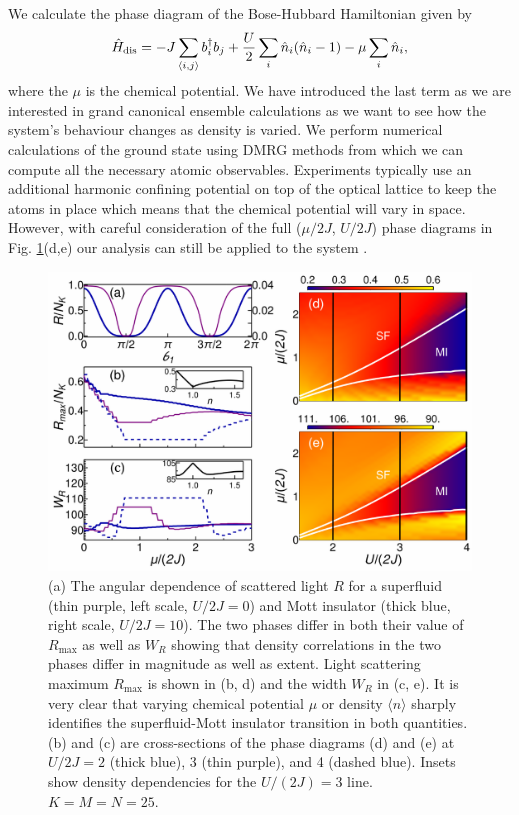 We calculate the phase diagram of the Bose-Hubbard Hamiltonian given
by
\begin{equation}
    \hat{H}_\mathrm{dis} = -J \sum_{\langle i, j \rangle}
    b^\dagger_i b_j + \frac{U}{2} \sum_i \hat{n}_i (\hat{n}_i - 1) - \mu
    \sum_i \hat{n}_i,
\end{equation}
where the $\mu$ is the chemical potential. We have introduced the last
term as we are interested in grand canonical ensemble calculations as
we want to see how the system's behaviour changes as density is
varied. We perform numerical calculations of the ground state using
DMRG methods \cite{tnt} from which we can compute all the necessary
atomic observables. Experiments typically use an additional harmonic
confining potential on top of the optical lattice to keep the atoms in
place which means that the chemical potential will vary in
space. However, with careful consideration of the full ($\mu/2J$,
$U/2J$) phase diagrams in Fig. \ref{fig:SFMI}(d,e) our analysis can
still be applied to the system \cite{batrouni2002}.

\begin{figure}  
  \centering
  \includegraphics[width=\linewidth]{oph11_3}
  \caption[Mapping the Bose-Hubbard Phase Diagram]{(a) The angular
    dependence of scattered light $R$ for a superfluid (thin purple,
    left scale, $U/2J = 0$) and Mott insulator (thick blue, right
    scale, $U/2J =10$). The two phases differ in both their value of
    $R_\text{max}$ as well as $W_R$ showing that density correlations
    in the two phases differ in magnitude as well as extent. Light
    scattering maximum $R_\text{max}$ is shown in (b, d) and the width
    $W_R$ in (c, e).  It is very clear that varying chemical potential
    $\mu$ or density $\langle n\rangle$ sharply identifies the
    superfluid-Mott insulator transition in both quantities. (b) and
    (c) are cross-sections of the phase diagrams (d) and (e) at
    $U/2J=2$ (thick blue), 3 (thin purple), and 4 (dashed
    blue). Insets show density dependencies for the $U/(2 J) = 3$
    line. $K=M=N=25$.}
	\label{fig:SFMI}
\end{figure}

